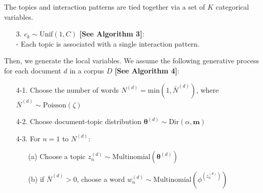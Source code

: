 \documentclass[a4paper]{article}
\begin{document}
\noindent The topics and interaction patterns are tied together via a set of $K$ categorical variables.
\begin{itemize}
	\item[3.] $c_k\sim \mbox{Unif}(1, C)$ \textbf{[See Algorithm 3]}: \\
	- Each topic is associated with a single interaction pattern.\\
\end{itemize}
\noindent Then, we generate the local variables. We assume the following generative process for each document $d$ in a corpus $D$ \textbf{[See Algorithm 4]}:
\begin{itemize}
	\item[4-1.] Choose the number of words $N^{(d)} = \mbox{min}(1, \bar N^{(d)})$, where $\bar N^{(d)}\sim \mbox{Poisson}(\zeta)$
	\item[4-2.] Choose document-topic distribution $\boldsymbol{\theta}^{(d)}\sim \mbox{Dir}(\alpha, \boldsymbol{m})$
	\item[4-3.] For $n=1$ to $N^{(d)}$:
	\begin{itemize}
		\item[(a)] Choose a topic $z_n^{(d)} \sim \mbox{Multinomial}(\boldsymbol{\theta}^{(d)})$
		\item[(b)] if $\bar N^{(d)}>0$, choose a word $w_n^{(d)} \sim\mbox{Multinomial} (\phi^{(z_n^{(d)})})$
	\end{itemize}
\end{itemize}
\end{document}
